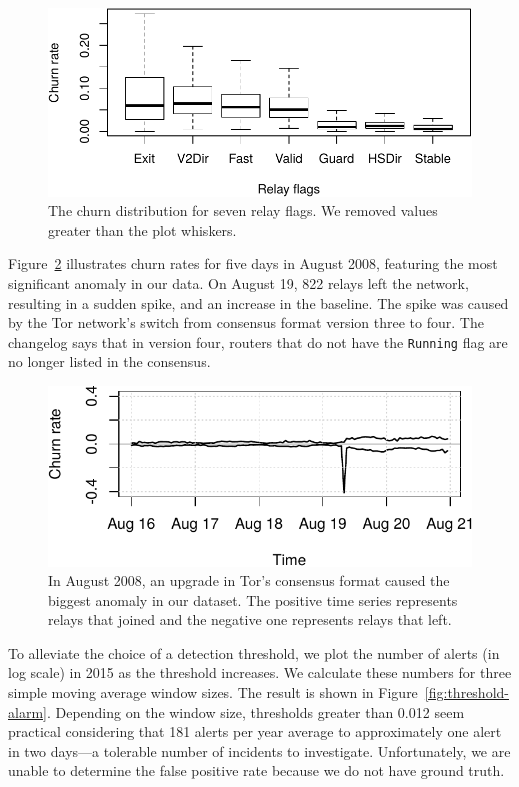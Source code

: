 \begin{figure}[t]
	\centering
	\includegraphics[width=\linewidth]{diagrams/churn-boxplot.pdf}
	\caption{The churn distribution for seven relay flags.  We removed values
		greater than the plot whiskers.}
	\label{fig:churn-boxplot}
\end{figure}

Figure~\ref{fig:2008-08} illustrates churn rates for five days in August 2008,
featuring the most significant anomaly in our data.  On August 19, 822 relays
left the network, resulting in a sudden spike, and an increase in the baseline.
The spike was caused by the Tor network's switch from consensus format version
three to four.  The changelog says that in version four, routers that
do not have the \texttt{Running} flag are no longer listed in the consensus.

\begin{figure}[t]
	\centering
	\includegraphics[width=\linewidth]{diagrams/2008-08.pdf}
	\caption{In August 2008, an upgrade in Tor's consensus format caused the
	biggest anomaly in our dataset.  The positive time series represents relays
	that joined and the negative one represents relays that left.}
	\label{fig:2008-08}
\end{figure}

To alleviate the choice of a detection threshold, we plot the number of alerts
(in log scale) in 2015 as the threshold increases.  We calculate these numbers
for three simple moving average window sizes.  The result is shown in
Figure~\ref{fig:threshold-alarm}.  Depending on the window size, thresholds
greater than 0.012 seem practical considering that 181 alerts per year average
to approximately one alert in two days---a tolerable number of incidents to
investigate.  Unfortunately, we are unable to determine the false positive rate
because we do not have ground truth.

